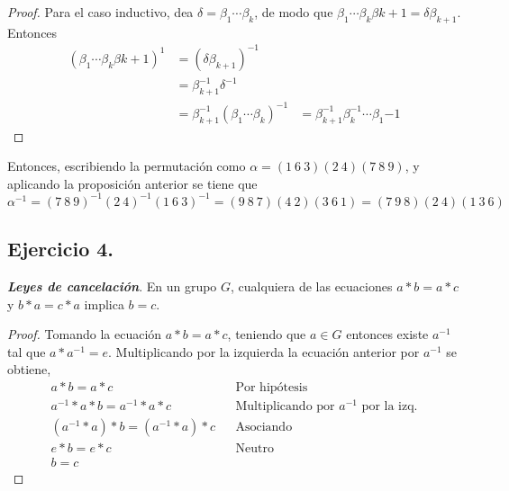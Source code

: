 \documentclass[11pt,letterpaper]{article}
\begin{document}
\begin{enumerate}[label=\alph*)]
\begin{prop}
\begin{proof}
            Para el caso inductivo, dea $\delta = \beta_1 \cdots \beta_k$, de modo que
            $\beta_1 \cdots \beta_k \beta{k+1} = \delta \beta_{k+1}$. Entonces
            \begin{align*}
                (\beta_1 \cdots \beta_k \beta{k+1})^{1}
                    &= (\delta \beta_{k+1})^{-1}\\
                    &= \beta_{k+1}^{-1} \delta^{-1}\\
                    &= \beta_{k+1}^{-1} (\beta_1 \cdots \beta_k)^{-1}
                    &= \beta_{k+1}^{-1} \beta_{k}^{-1} \cdots \beta_1{-1}
            \end{align*}
        \end{proof}
    \end{prop}
    Entonces, escribiendo la permutación como $\alpha = (1 \ 6 \ 3) (2 \ 4) (7 \ 8 \ 9)$, y aplicando
    la proposición anterior se tiene que
    \[
        \alpha^{-1} = (7 \ 8 \ 9)^{-1} (2 \ 4)^{-1} (1 \ 6 \ 3)^{-1} = (9 \ 8 \ 7) (4 \ 2) (3 \ 6 \ 1) = 
            (7 \ 9 \ 8) (2 \ 4) (1 \ 3 \ 6)
    \]
    
\end{enumerate}

\subsection*{Ejercicio 4.}
\textit{\textbf{Leyes de cancelación}}. En un grupo $G$, cualquiera de las ecuaciones $a \ast b = a \ast c$
y $b \ast a = c \ast a$ implica $b = c$.
\begin{proof}
    Tomando la ecuación $a \ast b = a \ast c$, teniendo que $a \in G$ entonces existe $a^{-1}$ tal que
    $a \ast a^{-1} = e$. Multiplicando por la izquierda la ecuación anterior por $a^{-1}$ se obtiene,
    \begin{align*}
        a \ast b = a \ast c && \text{Por hipótesis}\\
        a^{-1} \ast a \ast b = a^{-1} \ast a \ast c && \text{Multiplicando por $a^{-1}$ por la izq.}\\
        (a^{-1} \ast a) \ast b = (a^{-1} \ast a) \ast c && \text{Asociando}\\
        e \ast b = e \ast c && \text{Neutro}\\
        b = c
    \end{align*}
\end{proof}
\end{document}
